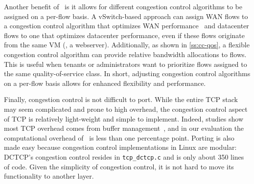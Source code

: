 Another benefit of~\acdc{} is it allows for different congestion control algorithms to be assigned on
a per-flow basis. %
A vSwitch-based approach can assign WAN flows to a congestion control algorithm that optimizes WAN performance~\cite{tan2006compound,flach2013reducing} and
datacenter flows to one that optimizes datacenter performance, even if these flows originate from the same VM (\eg{}, a webserver).
Additionally, as shown in \cref{ss:cc-qos}, a flexible congestion control algorithm can provide relative bandwidth allocations to flows.
This is useful when tenants or administrators want to prioritize flows assigned to the same quality-of-service class.
In short, adjusting congestion control algorithms on a per-flow basis allows for 
enhanced flexibility and performance.

Finally, congestion control is not difficult to port. While the entire TCP stack may seem complicated and prone to high overhead,
the congestion control aspect of TCP is relatively light-weight and simple to implement. Indeed, studies
show most TCP overhead comes from buffer management~\cite{optimize-tcp-receive}, and
in our evaluation the computational overhead of~\acdc{} is less than one percentage point.
Porting is also made easy because congestion control implementations in Linux
are modular: DCTCP's congestion control resides in {\tt tcp\_dctcp.c} and is only about 350 lines of code. Given
the simplicity of congestion control, it is not hard to move its functionality to another
layer.


